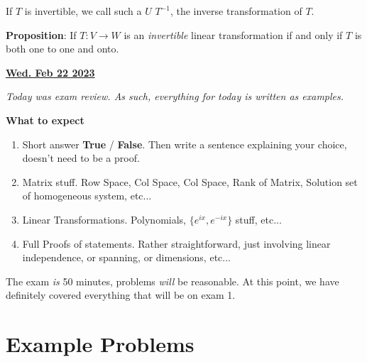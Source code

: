 \documentclass[12pt]{article}
\renewcommand{\date}[1]{\underline{\bf #1}}
\begin{document}

  If $T$ is invertible, we call such a $U$ $T^{-1}$, the inverse
  transformation of $T$.


  {\bf Proposition}: If $T: V \to W$ is an {\it invertible} linear
  transformation if and only if $T$ is both one to one and onto.

  
  \newpage

  \date{Wed. Feb 22 2023}

  {
    \it Today was exam review. As such, everything for today is written as
    examples.
  }

  {\bf What to expect}

  \begin{enumerate}
    \item Short answer {\bf True} / {\bf False}. Then write a sentence
      explaining your choice, doesn't need to be a proof.
    \item Matrix stuff. Row Space, Col Space, Col Space, Rank of Matrix,
      Solution set of homogeneous system, etc...
    \item Linear Transformations. Polynomials, $\{e^{ix}, e^{-ix}\}$ stuff,
      etc...
    \item Full Proofs of statements. Rather straightforward, just involving
      linear independence, or spanning, or dimensions, etc...
  \end{enumerate}

  The exam {\it is} 50 minutes, problems {\it will} be reasonable.
  At this point, we have definitely covered everything that will be on exam 1.

  \section{Example Problems}
\end{document}
